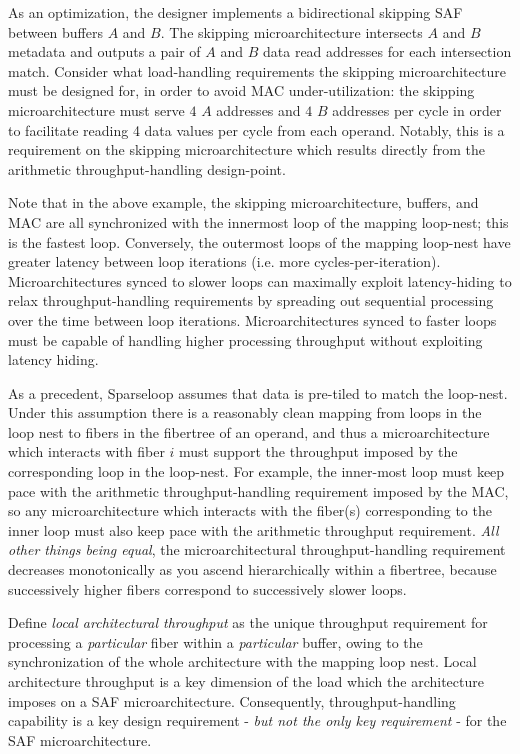 \begin{itemize}
    As an optimization, the designer implements a bidirectional skipping SAF between buffers $A$ and $B$. The skipping microarchitecture intersects $A$ and $B$ metadata and outputs a pair of $A$ and $B$ data read addresses for each intersection match. Consider what load-handling requirements the skipping microarchitecture must be designed for, in order to avoid MAC under-utilization: the skipping microarchitecture must serve $4$ $A$ addresses and $4$ $B$ addresses per cycle in order to facilitate reading 4 data values per cycle from each operand. Notably, this is a requirement on the skipping microarchitecture which results directly from the arithmetic throughput-handling design-point.

    Note that in the above example, the skipping microarchitecture, buffers, and MAC are all synchronized with the innermost loop of the mapping loop-nest; this is the fastest loop. Conversely, the outermost loops of the mapping loop-nest have greater latency between loop iterations (i.e. more cycles-per-iteration). Microarchitectures synced to slower loops can maximally exploit latency-hiding to relax throughput-handling requirements by spreading out sequential processing over the time between loop iterations. Microarchitectures synced to faster loops must be capable of handling higher processing throughput without exploiting latency hiding.
    
    As a precedent, Sparseloop\cite{sparseloop} assumes that data is pre-tiled to match the loop-nest. Under this assumption there is a reasonably clean mapping from loops in the loop nest to fibers in the fibertree of an operand, and thus a microarchitecture which interacts with fiber $i$ must support the throughput imposed by the corresponding loop in the loop-nest. For example, the inner-most loop must keep pace with the arithmetic throughput-handling requirement imposed by the MAC, so any microarchitecture which interacts with the fiber(s) corresponding to the inner loop must also keep pace with the arithmetic throughput requirement. \textit{All other things being equal}, the microarchitectural throughput-handling requirement decreases monotonically as you ascend hierarchically within a fibertree, because successively higher fibers correspond to successively slower loops. 
    
    Define \textit{local architectural throughput} as the unique throughput requirement for processing a \textit{particular} fiber within a \textit{particular} buffer, owing to the synchronization of the whole architecture with the mapping loop nest. Local architecture throughput is a key dimension of the load which the architecture imposes on a SAF microarchitecture. Consequently, throughput-handling capability is a key design requirement - \textit{but not the only key requirement} - for the SAF microarchitecture.
    

\end{itemize}
